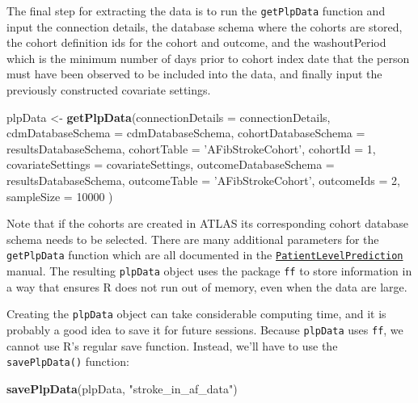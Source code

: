 \documentclass[]{book}
\newenvironment{Shaded}{\begin{snugshade}}{\end{snugshade}}
\newcommand{\KeywordTok}[1]{\textcolor[rgb]{0.13,0.29,0.53}{\textbf{#1}}}
\newcommand{\DataTypeTok}[1]{\textcolor[rgb]{0.13,0.29,0.53}{#1}}
\newcommand{\DecValTok}[1]{\textcolor[rgb]{0.00,0.00,0.81}{#1}}
\newcommand{\StringTok}[1]{\textcolor[rgb]{0.31,0.60,0.02}{#1}}
\newcommand{\NormalTok}[1]{#1}
\begin{document}
The final step for extracting the data is to run the \texttt{getPlpData}
function and input the connection details, the database schema where the
cohorts are stored, the cohort definition ids for the cohort and
outcome, and the washoutPeriod which is the minimum number of days prior
to cohort index date that the person must have been observed to be
included into the data, and finally input the previously constructed
covariate settings.

\begin{Shaded}
\begin{Highlighting}[]
\NormalTok{plpData <-}\StringTok{ }\KeywordTok{getPlpData}\NormalTok{(}\DataTypeTok{connectionDetails =}\NormalTok{ connectionDetails,}
                      \DataTypeTok{cdmDatabaseSchema =}\NormalTok{ cdmDatabaseSchema,}
                      \DataTypeTok{cohortDatabaseSchema =}\NormalTok{ resultsDatabaseSchema,}
                      \DataTypeTok{cohortTable =} \StringTok{'AFibStrokeCohort'}\NormalTok{,}
                      \DataTypeTok{cohortId =} \DecValTok{1}\NormalTok{,}
                      \DataTypeTok{covariateSettings =}\NormalTok{ covariateSettings,}
                      \DataTypeTok{outcomeDatabaseSchema =}\NormalTok{ resultsDatabaseSchema,}
                      \DataTypeTok{outcomeTable =} \StringTok{'AFibStrokeCohort'}\NormalTok{,}
                      \DataTypeTok{outcomeIds =} \DecValTok{2}\NormalTok{,}
                      \DataTypeTok{sampleSize =} \DecValTok{10000}
\NormalTok{)}
\end{Highlighting}
\end{Shaded}

Note that if the cohorts are created in ATLAS its corresponding cohort
database schema needs to be selected. There are many additional
parameters for the \texttt{getPlpData} function which are all documented
in the
\href{http://github.com/OHDSI/PatientLevelPrediction}{\texttt{PatientLevelPrediction}}
manual. The resulting \texttt{plpData} object uses the package
\texttt{ff} to store information in a way that ensures R does not run
out of memory, even when the data are large.

Creating the \texttt{plpData} object can take considerable computing
time, and it is probably a good idea to save it for future sessions.
Because \texttt{plpData} uses \texttt{ff}, we cannot use R's regular
save function. Instead, we'll have to use the \texttt{savePlpData()}
function:

\begin{Shaded}
\begin{Highlighting}[]
\KeywordTok{savePlpData}\NormalTok{(plpData, }\StringTok{"stroke_in_af_data"}\NormalTok{)}
\end{Highlighting}
\end{Shaded}
\end{document}
